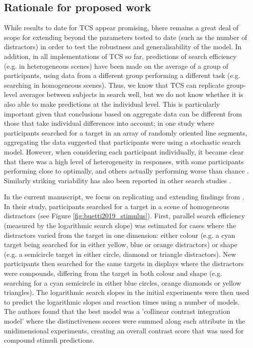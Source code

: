 \documentclass[smallextended, natbib]{svjour3}       %
\begin{document}
\subsection{Rationale for proposed work}

While results to date for TCS appear promising, bhere remains a great deal of scope for extending beyond the parameters tested to date (such as the number of distractors) in order to test the robustness and generalisability of the model. In addition, in all implementations of TCS so far, predictions of search efficiency (e.g. in heterogeneous scenes) have been made on the average of a group of participants, using data from a different group performing a different task (e.g. searching in homogeneous scenes). Thus, we know that TCS can replicate group-level averages between subjects in search well, but we do not know whether it is also able to make predictions at the individual level. This is particularly important given that conclusions based on aggregate data can be different from those that take individual differences into account; in one study where participants searched for a target in an array of randomly oriented line segments, aggregating the data suggested that participants were using a stochastic search model. However, when considering each participant individually, it became clear that there was a high level of heterogeneity in responses, with some participants performing close to optimally, and others actually performing worse than chance \citep{nowakowska2017human}. Similarly striking variability has also been reported in other search studies \citep{irons2016choosing, irons2018characterizing, clarke2020stable}. 

In the current manuscript, we focus on replicating and extending findings from \cite{buetti2019predicting}. In their study, participants searched for a target in a scene of homogeneous distractors (see Figure \ref{fig:buetti2019_stimulus}). First, parallel search efficiency (measured by the logarithmic search slope) was estimated for cases where the distractors varied from the target in one dimension: either colour (e.g. a cyan target being searched for in either yellow, blue or orange distractors) or shape (e.g. a semicircle target in either circle, diamond or triangle distractors). New participants then searched for the same targets in displays where the distractors were compounds, differing from the target in both colour and shape (e.g. searching for a cyan semicircle in either blue circles, orange diamonds or yellow triangles). The logarithmic search slopes in the initial experiments were then used to predict the logarithmic slopes and reaction times using a number of models. The authors found that the best model was a 'collinear contrast integration model' where the distinctiveness scores were summed along each attribute in the unidimensional experiments, creating an overall contrast score that was used for compound stimuli predictions.
\end{document}
